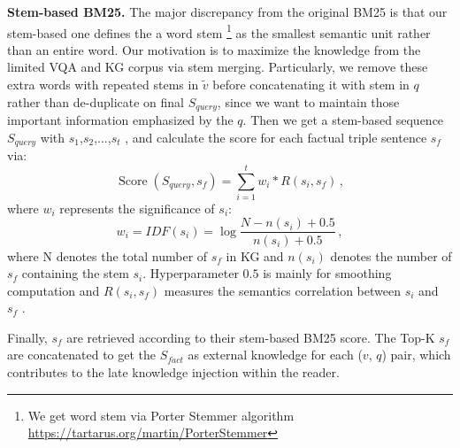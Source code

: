 \documentclass[sigconf]{acmart}
\begin{document}
\noindent\textbf{Stem-based BM25.}
The major discrepancy from the original BM25 is that our stem-based one defines the a word stem \footnote{ We get word stem via Porter Stemmer algorithm \url{https://tartarus.org/martin/PorterStemmer}} 
as the smallest semantic unit rather than an entire word. 
Our motivation is to maximize the knowledge from the limited VQA and KG corpus via stem merging.
Particularly, we remove these extra words with repeated stems in $\tilde{v}$ before concatenating it with stem in $q$ rather than de-duplicate on final $S_{query}$, since we want to maintain those important information emphasized by the $q$. 
Then we get a stem-based sequence $S_{query}$ with $s_1$,$s_2$,...,$s_t$ , and calculate the score for each factual triple sentence $s_{f}$ via: 
\begin{equation}
\operatorname{Score}(S_{query}, s_{f})=\sum_{i=1}^{t} w_{i} * R\left(s_{i}, s_{f}\right)\,,
\end{equation}
where $w_i$ represents the significance of $s_i$:
\begin{equation}
w_{i}=IDF\left(s_i\right)=\log \frac{N-n\left(s_i\right)+0.5}{n\left(s_i\right)+0.5}\,,
\end{equation}
where N denotes the total number of $s_{f}$ in KG and $n(s_i)$ denotes the number of $s_{f}$ containing the stem $s_i$. Hyperparameter $0.5$ is mainly for smoothing computation and $R(s_i,s_{f})$ measures the semantics correlation between $s_{i}$ and $s_{f}$ \citep{DBLP:journals/ftir/RobertsonZ09}.

Finally,  $s_{f}$ are retrieved according to their stem-based BM25 score. The Top-K $s_{f}$ are concatenated to get the $S_{fact}$  as external knowledge for each ($v$, $q$) pair, which contributes to the late knowledge injection within the reader.
\end{document}
